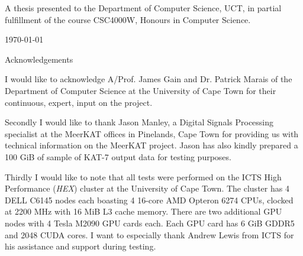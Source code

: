 \begin{titlepage}

\vspace{15pt}
\begin{center}
 A thesis presented to the Department of Computer Science, UCT, in partial fulfillment of the course CSC4000W, Honours in Computer Science.
\end{center}
\vspace{90pt}
{\large \today}\\[3cm] %


 

\vfill %

\end{titlepage}

\begin{center} 
  {\LARGE Acknowledgements}
\end{center}
\vspace{50pt}

I would like to acknowledge A/Prof. James Gain and Dr. Patrick Marais of the Department of Computer Science at the University of Cape Town for their continuous, expert, input on the project.

Secondly I would like to thank Jason Manley, a Digital Signals Processing specialist at the MeerKAT offices in Pinelands, Cape Town for providing us with technical information
on the MeerKAT project. Jason has also kindly prepared a 100 GiB of sample of KAT-7 output data for testing purposes.

Thirdly I would like to note that all tests were performed on the ICTS High Performance (\textit{HEX}) cluster at the University of Cape Town. The cluster has 4 DELL C6145 nodes each boasting 4 16-core
AMD Opteron 6274 CPUs, clocked at 2200 MHz with 16 MiB L3 cache memory. There are two additional GPU nodes with 4 Tesla M2090 GPU cards each. Each GPU card has 6 GiB GDDR5 and 2048 CUDA cores. I want to 
especially thank Andrew Lewis from ICTS for his assistance and support during testing.

